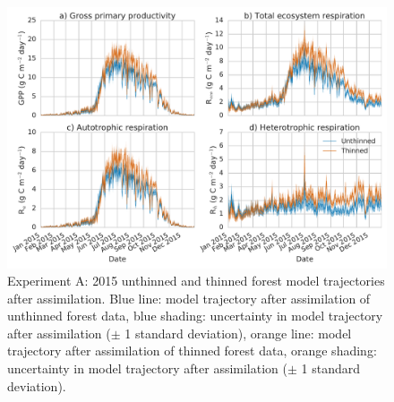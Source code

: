 \documentclass[draft,jgrga]{agutexSI}
\begin{document}

%
 
\begin{figure}
 \noindent\includegraphics[width=40pc]{flux_compa.pdf}
\caption{Experiment A: 2015 unthinned and thinned forest model trajectories after assimilation. Blue line: model trajectory after assimilation of unthinned forest data, blue shading: uncertainty in model trajectory after assimilation (\(\pm\) 1 standard deviation), orange line: model trajectory after assimilation of thinned forest data, orange shading: uncertainty in model trajectory after assimilation (\(\pm\) 1 standard deviation).}
 \label{fig:fluxcompa}
 \end{figure}
 
\end{document}
